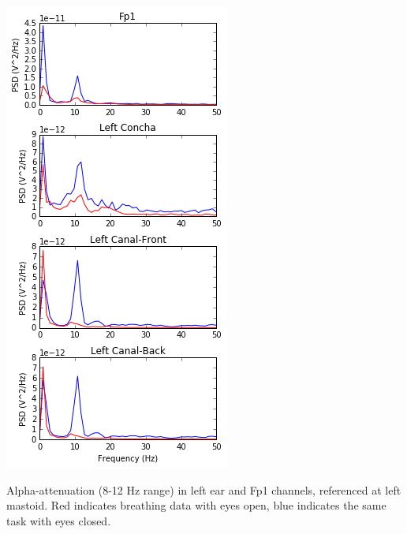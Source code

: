 \documentclass{sigchi-ext}
\begin{document}
\begin{marginfigure}[5pc]
\begin{minipage}{0.95\marginparwidth}
  \centering
  \includegraphics[width=0.9\marginparwidth]{figures/002_AlphaAtt_all.jpg}
  \caption{Alpha-attenuation (8-12 Hz range) in left ear and Fp1 channels, referenced at left mastoid. Red indicates breathing data with eyes open, blue indicates the same task with eyes closed.}\label{fig:alpha_atten}
\end{minipage}
\end{marginfigure}
\end{document}
